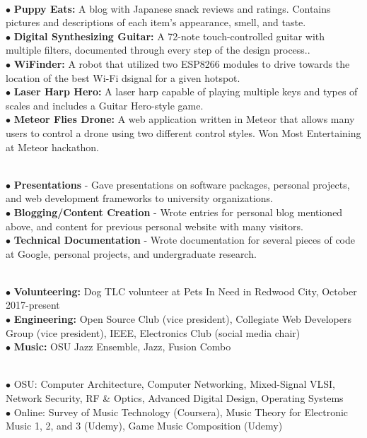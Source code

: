 \documentclass[10pt]{article}
\begin{document}
\\
$\bullet$ {\bf Puppy Eats:} A blog with Japanese snack reviews and ratings. Contains pictures and descriptions of each item's appearance, smell, and taste.\\
$\bullet$ {\bf Digital Synthesizing Guitar:} A 72-note touch-controlled guitar with multiple filters, documented through every step of the design process..\\
$\bullet$ {\bf WiFinder:} A robot that utilized two ESP8266 modules to drive towards the location of the best Wi-Fi dsignal for a given hotspot.\\
$\bullet$ {\bf Laser Harp Hero:} A laser harp capable of playing multiple keys and types of scales and includes a Guitar Hero-style game.\\
$\bullet$ {\bf Meteor Flies Drone:} A web application written in Meteor that allows many users to control a drone using two different control styles. Won Most Entertaining at Meteor hackathon.\\
\medskip

\\
$\bullet$ {\bf Presentations} - Gave presentations on software packages, personal projects, and web development frameworks to university organizations.\\
$\bullet$ {\bf Blogging/Content Creation} - Wrote entries for personal blog mentioned above, and content for previous personal website with many visitors.\\
$\bullet$ {\bf Technical Documentation} - Wrote documentation for several pieces of code at Google, personal projects, and undergraduate research.\\
\medskip

\\
$\bullet$ {\bf Volunteering:} Dog TLC volunteer at Pets In Need in Redwood City, October 2017-present\\
$\bullet$ {\bf Engineering:} Open Source Club (vice president), Collegiate Web Developers Group (vice president), IEEE, Electronics Club (social media chair)\\
$\bullet$ {\bf Music:} OSU Jazz Ensemble, Jazz, Fusion Combo\\
\medskip

\\
$\bullet$ OSU: Computer Architecture, Computer Networking, Mixed-Signal VLSI, Network Security, RF \& Optics, Advanced Digital Design, Operating Systems\\
$\bullet$ Online: Survey of Music Technology (Coursera), Music Theory for Electronic Music 1, 2, and 3 (Udemy), Game Music Composition (Udemy)
\end{document}

